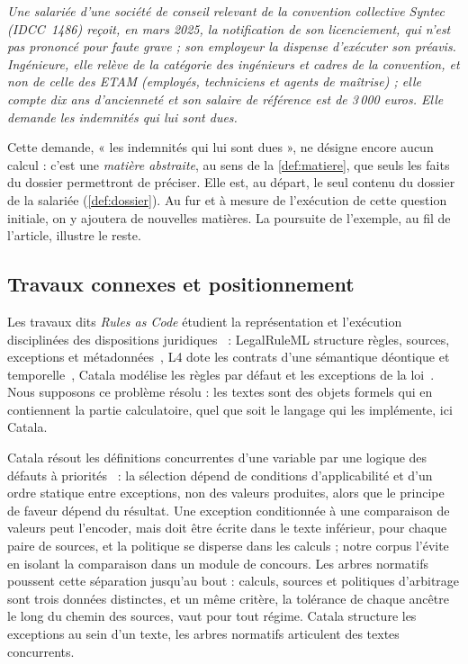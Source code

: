 \textit{Une salariée d'une société de conseil relevant de la convention collective
Syntec (IDCC~1486) reçoit, en mars 2025, la notification de son licenciement,
qui n'est pas prononcé pour faute grave ; son employeur la dispense d'exécuter
son préavis. Ingénieure, elle relève de la catégorie des ingénieurs et cadres
de la convention, et non de celle des ETAM (employés, techniciens et agents de
maîtrise) ; elle compte dix ans d'ancienneté et son salaire de référence est
de 3\,000 euros. Elle demande les indemnités qui lui sont dues.}

Cette demande, « les indemnités qui lui sont dues », ne désigne encore aucun
calcul : c'est une \emph{matière abstraite}, au sens de la
\autoref{def:matiere}, que seuls les faits du dossier permettront de préciser.
Elle est, au départ, le seul contenu du dossier de la salariée
(\autoref{def:dossier}). Au fur et à mesure de l'exécution de cette question
initiale, on y ajoutera de nouvelles matières. La poursuite de l'exemple, au
fil de l'article, illustre le reste.

\subsection{Travaux connexes et positionnement}\label{sec:related}

Les travaux dits \emph{Rules as Code} étudient la représentation et
l'exécution disciplinées des dispositions juridiques~\cite{ali2025} :
LegalRuleML structure règles, sources, exceptions et
métadonnées~\cite{nazarenko2016,legalruleml}, L4 dote les contrats d'une
sémantique déontique et temporelle~\cite{watt2023}, Catala modélise les
règles par défaut et les exceptions de la loi~\cite{merigoux2021}. Nous
supposons ce problème résolu : les textes sont des objets formels qui en
contiennent la partie calculatoire, quel que soit le langage qui les
implémente, ici Catala.

Catala résout les définitions concurrentes d'une variable par une logique des
défauts à priorités~\cite{merigoux2021} : la sélection dépend de conditions
d'applicabilité et d'un ordre statique entre exceptions, non des valeurs
produites, alors que le principe de faveur dépend du résultat. Une exception
conditionnée à une comparaison de valeurs peut l'encoder, mais doit être
écrite dans le texte inférieur, pour chaque paire de sources, et la politique
se disperse dans les calculs ; notre corpus l'évite en isolant la comparaison
dans un module de concours. Les arbres normatifs poussent cette séparation
jusqu'au bout : calculs, sources et politiques d'arbitrage sont trois données
distinctes, et un même critère, la tolérance de chaque ancêtre le long du
chemin des sources, vaut pour tout régime. Catala structure les exceptions au
sein d'un texte, les arbres normatifs articulent des textes concurrents.

